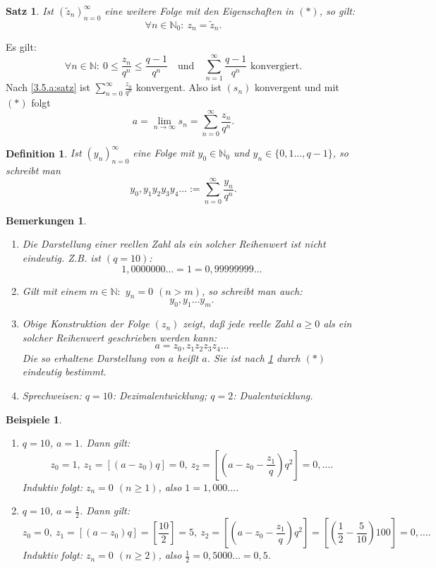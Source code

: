 \documentclass[12pt]{extreport} %
\newcommand{\N}{\mathbb{N}}
\theoremstyle{named}
\theoremstyle{itshape}
\newtheorem{satz}[unnamedtheorem]{Satz}
\newtheorem*{definition}{Definition}
\theoremstyle{normal}
\newtheorem*{beispiele}{Beispiele}
\newtheorem*{bemerkungen}{Bemerkungen}
\begin{document}
\begin{satz} \label{5.1:satz}
	Ist $(\tilde{z}_{n})_{n=0}^{\infty}$ eine weitere Folge mit den Eigenschaften in $(*)$, so gilt: 
	$$\forall n \in \N_{0}: ~  z_{n} = \tilde{z}_{n}.$$
\end{satz}

\bigskip

Es gilt:
	$$\forall n \in \N: ~   0 \leq \frac{z_{n}}{q^{n}} \leq \frac{q - 1}{q^n} \quad \text{und} \quad \sum_{n=1}^{\infty} \frac{q - 1}{q^{n}} \text{ konvergiert}. $$
Nach \ref{3.5.a:satz} ist $\sum_{n=0}^{\infty}\frac{z_{n}}{q^{n}}$ konvergent. Also ist $(s_{n})$ konvergent und mit $(\ast)$ folgt
	$$ a = \lim_{n \to \infty} s_{n} = \sum_{n=0}^{\infty} \frac{z_{n}}{q^{n}}. $$
	
\begin{definition}
Ist $(y_n)_{n=0}^\infty$ eine Folge mit $y_0 \in \N_0$ und $y_n \in \{0,1 \dots, q-1\}$, so schreibt man 
$$
y_0,y_1 y_2 y_3 y_4 \dotsc := \sum_{n=0}^{\infty} \frac{y_{n}}{q^{n}}.
$$
\end{definition}

\begin{bemerkungen} \
\begin{enumerate}
\item Die Darstellung einer reellen Zahl als ein solcher Reihenwert ist nicht eindeutig. Z.B. ist $(q=10)$:
$$
1,0000000 \dotsc = 1 = 0,99999999 \dotsc
$$
\item Gilt mit einem $m \in \N:$ $y_{n} = 0$ $(n > m)$, so schreibt man auch: 
$$
y_{0}, y_{1} \dotsc y_{m}.
$$
\item Obige Konstruktion der Folge $(z_n)$ zeigt, da{\ss} jede reelle Zahl $a \ge 0$ als ein solcher Reihenwert geschrieben werden kann:
$$
a = z_{0}, z_{1} z_{2} z_{3} z_4 \dotsc
$$
Die so erhaltene Darstellung von $a$ hei{\ss}t  $a$. Sie ist nach \ref{5.1:satz} durch $(\ast)$ eindeutig
bestimmt.
\item Sprechweisen: $q = 10$: Dezimalentwicklung; $q = 2$: Dualentwicklung.
\end{enumerate}
\end{bemerkungen}

\begin{beispiele} ~\
	\begin{enumerate}
		\item $q = 10$, $a = 1$. Dann gilt: 
		$$z_{0} = 1, ~ z_{1} = [(a - z_{0})q] = 0, ~ z_{2} = [(a - z_{0} - \frac{z_{1}}{q})q^{2}] = 0, \dotsc.$$
		Induktiv folgt: $z_{n} = 0$ $(n \geq 1)$, also $1 = 1,000\dotsc$.
		\item $q = 10$, $a = \frac{1}{2}$. Dann gilt:
		$$z_{0} = 0, ~ z_{1} = [(a - z_{0})q] = [\frac{10}{2}] = 5, ~ z_{2} = [(a - z_{0} - \frac{z_{1}}{q})q^{2}] = [(\frac{1}{2} - \frac{5}{10}) 100] = 0, \dotsc. $$
		Induktiv folgt: $z_{n} = 0$ $(n \geq 2)$, also $\frac{1}{2} = 0,5000\dotsc = 0,5$.
	\end{enumerate}
\end{beispiele}
\end{document}
